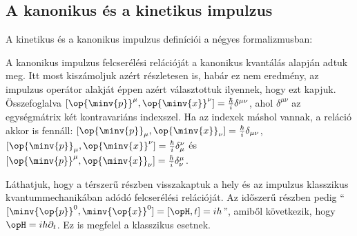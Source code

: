   \subsection{A kanonikus és a kinetikus impulzus}\label{ss:05-kankinimp}
   
   A kinetikus és a kanonikus impulzus definíciói a négyes formalizmusban:
   
   A kanonikus impulzus felcserélési relációját a kanonikus kvantálás alapján adtuk meg.
   Itt most kiszámoljuk azért részletesen is, habár ez nem eredmény, az impulzus operátor alakját éppen azért választottuk ilyennek, hogy ezt kapjuk. 
   Összefoglalva $[\op{\minv{p}}^\mu,\op{\minv{x}}^\nu]=\frac{\hbar}{i}\delta^{\mu\nu}$, ahol $\delta^{\mu\nu}$ az egységmátrix két kontravariáns indexszel.
   Ha az indexek máshol vannak, a reláció akkor is fennáll: $[\op{\minv{p}}_\mu,\op{\minv{x}}_\nu]=\frac{\hbar}{i}\delta_{\mu\nu}$, $[\op{\minv{p}}_\mu,\op{\minv{x}}^\nu]=\frac{\hbar}{i}\delta^{\nu}_\mu$ és $[\op{\minv{p}}^\mu,\op{\minv{x}}_\nu]=\frac{\hbar}{i}\delta^\mu_\nu$.
   
   Láthatjuk, hogy a térszerű részben visszakaptuk a hely és az impulzus klasszikus kvantummechanikában adódó felcserélési relációját.
   Az időszerű részben pedig ``$[\minv{\op{p}}^0,\minv{\op{x}}^0]=[\opH,t]=ih$'', amiből következik, hogy $\opH=ih\partial_t$.
   Ez is megfelel a klasszikus esetnek.
   
